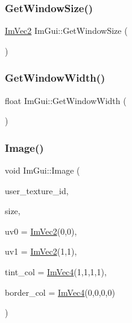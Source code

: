 \hypertarget{namespace_im_gui_aaa5c0bfac7125ba9850a08b6db2e90c9}{}\label{namespace_im_gui_aaa5c0bfac7125ba9850a08b6db2e90c9} 
\subsubsection{\texorpdfstring{Get\+Window\+Size()}{GetWindowSize()}}
{\footnotesize\ttfamily \hyperlink{struct_im_vec2}{Im\+Vec2} Im\+Gui\+::\+Get\+Window\+Size (\begin{DoxyParamCaption}{ }\end{DoxyParamCaption})}

\hypertarget{namespace_im_gui_a471ff23945b99541c506dbdc2a9004cf}{}\label{namespace_im_gui_a471ff23945b99541c506dbdc2a9004cf} 
\subsubsection{\texorpdfstring{Get\+Window\+Width()}{GetWindowWidth()}}
{\footnotesize\ttfamily float Im\+Gui\+::\+Get\+Window\+Width (\begin{DoxyParamCaption}{ }\end{DoxyParamCaption})}

\hypertarget{namespace_im_gui_ad8705ac3b718c1b2e84e7b8c34f90249}{}\label{namespace_im_gui_ad8705ac3b718c1b2e84e7b8c34f90249} 
\subsubsection{\texorpdfstring{Image()}{Image()}}
{\footnotesize\ttfamily void Im\+Gui\+::\+Image (\begin{DoxyParamCaption}\item[{Im\+Texture\+ID}]{user\+\_\+texture\+\_\+id,  }\item[{const \hyperlink{struct_im_vec2}{Im\+Vec2} \&}]{size,  }\item[{const \hyperlink{struct_im_vec2}{Im\+Vec2} \&}]{uv0 = {\ttfamily \hyperlink{struct_im_vec2}{Im\+Vec2}(0,0)},  }\item[{const \hyperlink{struct_im_vec2}{Im\+Vec2} \&}]{uv1 = {\ttfamily \hyperlink{struct_im_vec2}{Im\+Vec2}(1,1)},  }\item[{const \hyperlink{struct_im_vec4}{Im\+Vec4} \&}]{tint\+\_\+col = {\ttfamily \hyperlink{struct_im_vec4}{Im\+Vec4}(1,1,1,1)},  }\item[{const \hyperlink{struct_im_vec4}{Im\+Vec4} \&}]{border\+\_\+col = {\ttfamily \hyperlink{struct_im_vec4}{Im\+Vec4}(0,0,0,0)} }\end{DoxyParamCaption})}

